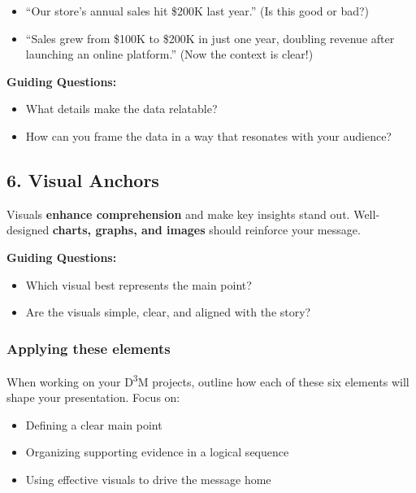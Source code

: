\documentclass[
  11pt,
]{article}
\providecommand{\tightlist}{%
  \setlength{\itemsep}{0pt}\setlength{\parskip}{0pt}}
\begin{document}
\begin{itemize}
\tightlist
\item
  ``Our store's annual sales hit \$200K last year.'' (Is this good or
  bad?)\\
\item
  ``Sales grew from \$100K to \$200K in just one year, doubling revenue
  after launching an online platform.'' (Now the context is clear!)
\end{itemize}

\textbf{Guiding Questions:}

\begin{itemize}
\tightlist
\item
  What details make the data relatable?
\item
  How can you frame the data in a way that resonates with your audience?
\end{itemize}

\subsection{\texorpdfstring{\textbf{6. Visual
Anchors}}{6. Visual Anchors}}\label{visual-anchors}

Visuals \textbf{enhance comprehension} and make key insights stand out.
Well-designed \textbf{charts, graphs, and images} should reinforce your
message.

\textbf{Guiding Questions:}

\begin{itemize}
\tightlist
\item
  Which visual best represents the main point?
\item
  Are the visuals simple, clear, and aligned with the story?
\end{itemize}

\subsubsection{\texorpdfstring{\textbf{Applying these
elements}}{Applying these elements}}\label{applying-these-elements}

When working on your D\textsuperscript{3}M projects, outline how each of
these six elements will shape your presentation. Focus on:

\begin{itemize}
\tightlist
\item
  Defining a clear main point
\item
  Organizing supporting evidence in a logical sequence
\item
  Using effective visuals to drive the message home
\end{itemize}
\end{document}
